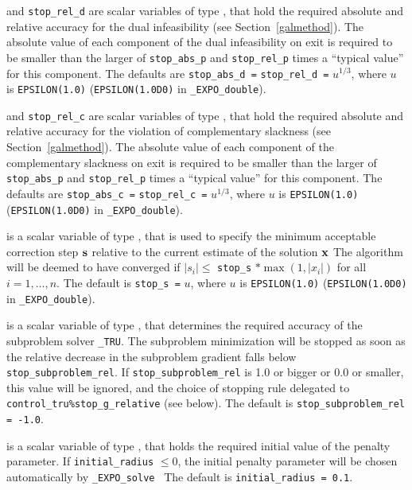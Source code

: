 \documentclass{galahad}
\newcommand{\packagename}{EXPO}
\newcommand{\fullpackagename}{\libraryname\_\packagename}
\newcommand{\solver}{{\tt \fullpackagename\_solve}}
\begin{document}
\begin{description}
 and {\tt stop\_rel\_d}
are scalar variables of type \realdp, that hold the
required absolute and relative accuracy for the dual infeasibility
(see Section~\ref{galmethod}).
The absolute value of each component of the dual infeasibility
on exit is required to be smaller than the larger of {\tt stop\_abs\_p} and
{\tt stop\_rel\_p} times a ``typical value'' for this component.
The defaults are {\tt stop\_abs\_d =} {\tt stop\_rel\_d =} $u^{1/3}$,
where $u$ is {\tt EPSILON(1.0)} ({\tt EPSILON(1.0D0)} in
{\tt \fullpackagename\_double}).

 and {\tt stop\_rel\_c}
are scalar variables of type \realdp, that hold the required absolute and 
relative accuracy for the violation of complementary slackness
(see Section~\ref{galmethod}).
The absolute value of each component of the complementary slackness
on exit is required to be smaller than the larger of {\tt stop\_abs\_p} and
{\tt stop\_rel\_p} times a ``typical value'' for this component.
The defaults are {\tt stop\_abs\_c =} {\tt stop\_rel\_c =} $u^{1/3}$,
where $u$ is {\tt EPSILON(1.0)} ({\tt EPSILON(1.0D0)} in
{\tt \fullpackagename\_double}).

 is a scalar variable of type \realdp,
that is used to specify the minimum acceptable correction step ${\mathbf{s}}$
relative to the current estimate of the solution ${\mathbf{x}}$
The algorithm will be deemed to have converged if $|s_i| \leq$
{\tt stop\_s} $\ast \max( 1, |x_i|)$ for all $i = 1, \ldots, n$.
The default is {\tt stop\_s =} $u$,
where $u$ is {\tt EPSILON(1.0)} ({\tt EPSILON(1.0D0)} in
{\tt \fullpackagename\_double}).

 is a scalar variable of type \realdp, 
that determines the required accuracy of the subproblem solver
{\tt \libraryname\_TRU}. The subproblem minimization will be stopped as 
soon as the relative decrease in the subproblem gradient falls below 
{\tt stop\_subproblem\_rel}. If {\tt stop\_subproblem\_rel} is 1.0 or bigger 
or 0.0 or smaller, this value will be ignored, and the choice of stopping 
rule delegated to {\tt control\_tru\%stop\_g\_relative} (see below).
The default is {\tt stop\_subproblem\_rel = -1.0}.

 is a scalar variable of type \realdp, that holds
the required initial value of the penalty parameter. If
{\tt initial\_radius} $\leq 0$, the initial penalty parameter will be 
chosen automatically by \solver\
The default is {\tt initial\_radius = 0.1}.


\end{description}
\end{document}
